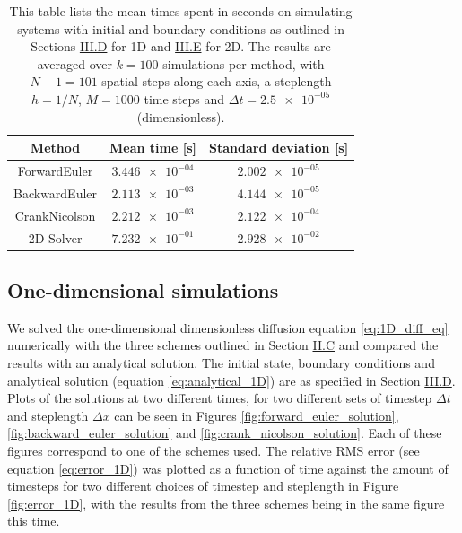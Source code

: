 \documentclass[reprint,english,notitlepage]{revtex4-1}  %
\begin{document}
\begin{table}[H]
\centering
\caption{This table lists the mean times spent in seconds on simulating systems with initial and boundary conditions as outlined in Sections \hyperref[sec:method_1D_sims]{III.D} for 1D and \hyperref[sec:method_2D_sim]{III.E} for 2D. The results are averaged over \(k = 100\) simulations per method, with $N+1 = 101$ spatial steps along each axis, a steplength \( h = 1/N\), \(M = 1000\) time steps and \(\Delta t = \num{2.5e-05}\) (dimensionless).} \label{table:benchmark}
\begin{tabular}{|c|c|c|}
\hline
Method & Mean time [s] & Standard deviation [s]\\\hline
ForwardEuler & \(\num{3.446e-04}\) & \(\num{2.002e-05}\) \\
BackwardEuler & \(\num{2.113e-03}\) & \(\num{4.144e-05}\) \\
CrankNicolson & \(\num{2.212e-03}\) & \(\num{2.122e-04}\) \\
2D Solver & \(\num{7.232e-01}\) & \(\num{2.928e-02}\) \\\hline
\end{tabular}
\end{table}

\subsection{One-dimensional simulations} \label{sec:results_1D}

We solved the one-dimensional dimensionless diffusion equation \eqref{eq:1D_diff_eq} numerically with the three schemes outlined in Section \hyperref[sec:formalism_numerical_1D]{II.C} and compared the results with an analytical solution. The initial state, boundary conditions and analytical solution (equation \eqref{eq:analytical_1D}) are as specified in Section \hyperref[sec:method_1D_sims]{III.D}. Plots of the solutions at two different times, for two different sets of timestep $\Delta t$ and steplength $\Delta x$ can be seen in Figures \ref{fig:forward_euler_solution}, \ref{fig:backward_euler_solution} and \ref{fig:crank_nicolson_solution}. Each of these figures correspond to one of the schemes used. The relative RMS error (see equation \eqref{eq:error_1D}) was plotted as a function of time against the amount of timesteps for two different choices of timestep and steplength in Figure \ref{fig:error_1D}, with the results from the three schemes being in the same figure this time. 
\end{document}
